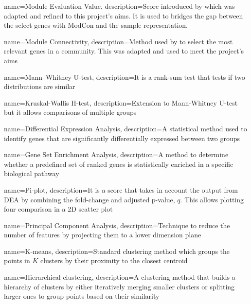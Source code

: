 {
    name=Module Evaluation Value,
    description={Score introduced by \citep{Care2019-ij} which was adapted and refined to this project's aims. It is used to bridges the gap between the select genes with ModCon and the sample representation.}
}

{
    name=Module Connectivity,
    description={Method used by \citep{Care2019-ij} to select the most relevant genes in a community. This was adapted and used to meet the project's aims}
}

{
    name=Mann–Whitney U-test,
    description={It is a rank-sum test that tests if two distributions are similar}
}

{
    name=Kruskal-Wallis H-test,
    description={Extension to Mann-Whitney U-test but it allows comparisons of multiple groups}
}

{
    name=Differential Expression Analysis,
    description={A statistical method used to identify genes that are significantly differentially expressed between two groups}
}

{
    name=Gene Set Enrichment Analysis,
    description={A method to determine whether a predefined set of ranked genes is statistically enriched in a specific biological pathway}
}

{
    name=Pi-plot,
    description={It is a score that takes in account the output from DEA by combining the fold-change and adjusted p-value, $q$. This allows plotting four comparison in a 2D scatter plot}
}


{
    name=Principal Component Analysis,
    description={Technique to reduce the number of features by projecting them to a lower dimension plane}
}

{
    name=K-means,
    description={Standard clustering method which groups the points in $K$ clusters by their proximity to the closest centroid}
}

{
    name=Hierarchical clustering,
    description={A clustering method that builds a hierarchy of clusters by either iteratively merging smaller clusters or splitting larger ones to group points based on their similarity}
}